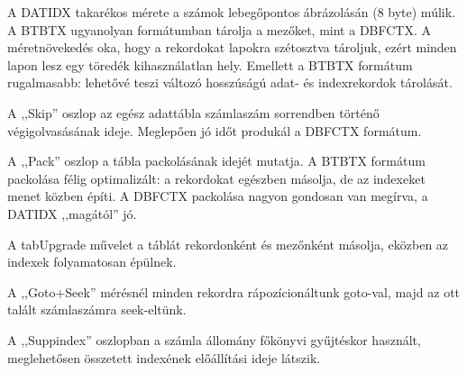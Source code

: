 A DATIDX takarékos mérete a számok lebegőpontos ábrázolásán (8 byte) 
múlik. A BTBTX ugyanolyan formátumban tárolja a mezőket, mint a DBFCTX. 
A méretnövekedés oka, hogy a rekordokat lapokra szétosztva tároljuk,
ezért minden lapon lesz egy töredék kihasználatlan hely. Emellett
a BTBTX formátum rugalmasabb: lehetővé teszi változó hosszúságú
adat-{} és indexrekordok tárolását.

A ,,Skip'' oszlop az egész adattábla számlaszám sorrendben történő
végigolvasásának ideje. Meglepően jó időt produkál a DBFCTX formátum.

A ,,Pack'' oszlop a tábla packolásának idejét mutatja. A BTBTX 
formátum packolása félig optimalizált: a rekordokat egészben másolja,
de az indexeket menet közben építi. A DBFCTX packolása nagyon gondosan van
megírva, a DATIDX ,,magától'' jó.

A tabUpgrade művelet a táblát rekordonként és mezőnként másolja,
eközben az indexek folyamatosan épülnek. 

A ,,Goto+Seek'' mérésnél minden rekordra rápozícionáltunk goto-val,
majd az ott talált számlaszámra seek-eltünk.

A ,,Suppindex'' oszlopban a számla állomány főkönyvi gyűjtéskor használt,
meglehetősen összetett indexének előállítási ideje látszik.


 